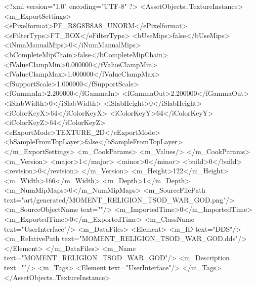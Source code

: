 <?xml version="1.0" encoding="UTF-8" ?>
<AssetObjects..TextureInstance>
	<m_ExportSettings>
		<ePixelformat>PF_R8G8B8A8_UNORM</ePixelformat>
		<eFilterType>FT_BOX</eFilterType>
		<bUseMips>false</bUseMips>
		<iNumManualMips>0</iNumManualMips>
		<bCompleteMipChain>false</bCompleteMipChain>
		<fValueClampMin>0.000000</fValueClampMin>
		<fValueClampMax>1.000000</fValueClampMax>
		<fSupportScale>1.000000</fSupportScale>
		<fGammaIn>2.200000</fGammaIn>
		<fGammaOut>2.200000</fGammaOut>
		<iSlabWidth>0</iSlabWidth>
		<iSlabHeight>0</iSlabHeight>
		<iColorKeyX>64</iColorKeyX>
		<iColorKeyY>64</iColorKeyY>
		<iColorKeyZ>64</iColorKeyZ>
		<eExportMode>TEXTURE_2D</eExportMode>
		<bSampleFromTopLayer>false</bSampleFromTopLayer>
	</m_ExportSettings>
	<m_CookParams>
		<m_Values/>
	</m_CookParams>
	<m_Version>
		<major>1</major>
		<minor>0</minor>
		<build>0</build>
		<revision>0</revision>
	</m_Version>
	<m_Height>122</m_Height>
	<m_Width>166</m_Width>
	<m_Depth>1</m_Depth>
	<m_NumMipMaps>0</m_NumMipMaps>
	<m_SourceFilePath text="art/generated/MOMENT_RELIGION_TSOD_WAR_GOD.png"/>
	<m_SourceObjectName text=""/>
	<m_ImportedTime>0</m_ImportedTime>
	<m_ExportedTime>0</m_ExportedTime>
	<m_ClassName text="UserInterface"/>
	<m_DataFiles>
		<Element>
			<m_ID text="DDS"/>
			<m_RelativePath text="MOMENT_RELIGION_TSOD_WAR_GOD.dds"/>
		</Element>
	</m_DataFiles>
	<m_Name text="MOMENT_RELIGION_TSOD_WAR_GOD"/>
	<m_Description text=""/>
	<m_Tags>
		<Element text="UserInterface"/>
	</m_Tags>
</AssetObjects..TextureInstance>
